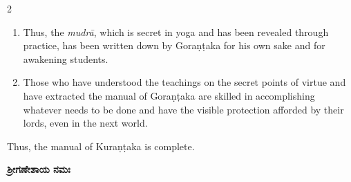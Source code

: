 \begin{nohyp}
\begin{multicols}{2}
\begin{eng}
\begin{enumerate}[nosep]
\item[24.] Thus, the \textit{mudrā}, which is secret in yoga and has been revealed through practice, has been written down by Goraṇṭaka for his own sake and for awakening students.
\item[25.] Those who have understood the teachings on the secret points of virtue and have extracted the manual of Goraṇṭaka are skilled in accomplishing whatever needs to be done and have the visible protection afforded by their lords, even in the next world.
\end{enumerate}
Thus, the manual of Kuraṇṭaka is complete.
\end{eng}
\end{multicols}
\end{nohyp}
\vskip 1cm

\pushpika

\newpage
\null\vspace{0.1cm}

\begin{kan}
\centerline{}
\vskip 7pt

\centerline{{\Large\bfseries ಶ್ರೀಗಣೇಶಾಯ ನಮಃ}}
\end{kan}
\vskip 7pt

